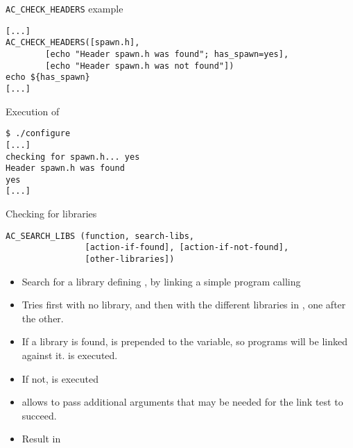 \begin{frame}[fragile]{{\tt AC\_CHECK\_HEADERS} example}

\begin{block}{}
\begin{verbatim}
[...]
AC_CHECK_HEADERS([spawn.h],
        [echo "Header spawn.h was found"; has_spawn=yes],
        [echo "Header spawn.h was not found"])
echo ${has_spawn}
[...]
\end{verbatim}
\end{block}

\begin{block}{Execution of }
\begin{verbatim}
$ ./configure
[...]
checking for spawn.h... yes
Header spawn.h was found
yes
[...]
\end{verbatim}
\end{block}

\end{frame}

\begin{frame}[fragile]{Checking for libraries}
  \begin{block}{}
\begin{verbatim}
AC_SEARCH_LIBS (function, search-libs,
                [action-if-found], [action-if-not-found],
                [other-libraries])
\end{verbatim}
  \end{block}

  \begin{itemize}
  \item Search for a library defining , by linking a
    simple program calling 
  \item Tries first with no library, and then with the different
    libraries in , one after the other.
  \item If a library is found,  is prepended to the
     variable, so programs will be linked against
    it.  is executed.
  \item If not,  is executed
  \item {} allows to pass additional
     arguments that may be needed for the link test to
    succeed.
  \item Result in 
  \end{itemize}
\end{frame}


